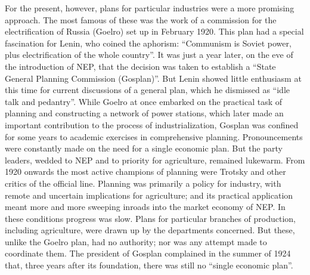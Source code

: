 For the present, however, plans for particular industries were a more promising approach. The most famous of these was the work of a commission for the electrification of Russia (Goelro) set up in February 1920. This plan had a special fascination for Lenin, who coined the aphorism: ``Communism is Soviet power, plus electrification of the whole country''. It was just a year later, on the eve of the introduction of NEP, that the decision was taken to establish a ``State General Planning Commission (Gosplan)''. But Lenin showed little enthusiasm at this time for current discussions of a general plan, which he dismissed as ``idle talk and pedantry''. While Goelro at once embarked on the practical task of planning and constructing a network of power stations, which later made an important contribution to the process of industrialization, Gosplan was confined for some years to academic exercises in comprehensive planning. Pronouncements were constantly made on the need for a single economic plan. But the party leaders, wedded to NEP and to priority for agriculture, remained lukewarm. From 1920 onwards the most active champions of planning were Trotsky and other critics of the official line. Planning was primarily a policy for industry, with remote and uncertain implications for agriculture; and its practical application meant more and more sweeping inroads into the market economy of NEP. In these conditions progress was slow. Plans for particular branches of production, including agriculture, were drawn up by the departments concerned. But these, unlike the Goelro plan, had no authority; nor was any attempt made to coordinate them. The president of Gosplan complained in the summer of 1924 that, three years after its foundation, there was still no ``single economic plan''. 

